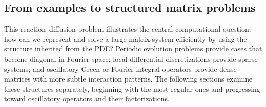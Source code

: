 \subsection{From examples to structured matrix problems}

This reaction--diffusion problem illustrates the central computational question: how can we represent and solve a large matrix system efficiently by using the structure inherited from the PDE? Periodic evolution problems provide cases that become diagonal in Fourier space; local differential discretizations provide sparse systems; and oscillatory Green or Fourier integral operators provide dense matrices with more subtle interaction patterns. The following sections examine these structures separately, beginning with the most regular ones and progressing toward oscillatory operators and their factorizations.
